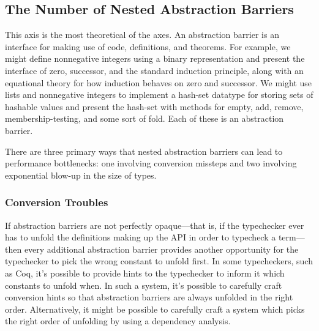 %

\subsection{The Number of Nested Abstraction Barriers} \label{sec:axis-nested-abstraction-barriers}

%

This axis is the most theoretical of the axes.
An abstraction barrier is an interface for making use of code, definitions, and theorems.
For example, we might define nonnegative integers using a binary representation and present the interface of zero, successor, and the standard induction principle, along with an equational theory for how induction behaves on zero and successor.
%
We might use lists and nonnegative integers to implement a hash-set datatype for storing sets of hashable values and present the hash-set with methods for empty, add, remove, membership-testing, and some sort of fold.
Each of these is an abstraction barrier.

There are three primary ways that nested abstraction barriers can lead to performance bottlenecks: one involving conversion missteps and two involving exponential blow-up in the size of types.

\subsubsection{Conversion Troubles} \label{sec:abstraction-barriers:conversion-troubles}
If abstraction barriers are not perfectly opaque---that is, if the typechecker ever has to unfold the definitions making up the API in order to typecheck a term---then every additional abstraction barrier provides another opportunity for the typechecker to pick the wrong constant to unfold first.
%
In some typecheckers, such as Coq, it's possible to provide hints to the typechecker to inform it which constants to unfold when.
In such a system, it's possible to carefully craft conversion hints so that abstraction barriers are always unfolded in the right order.
Alternatively, it might be possible to carefully craft a system which picks the right order of unfolding by using a dependency analysis.

